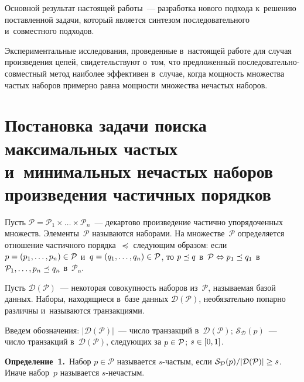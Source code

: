 \begin{multicols}{2}
    Основной результат настоящей работы~--- разработка нового подхода к~решению 
    поставленной задачи, который является синтезом последовательного и~совместного подходов. 
    
    Экспериментальные исследования, проведенные в~настоящей работе для случая
     произведения цепей, свидетельствуют о~том, что предложенный по\-сле\-до\-ва\-тель\-но-со\-вмест\-ный 
     метод наиболее эффективен в~случае, когда мощ\-ность множества час\-тых наборов примерно 
     равна мощ\-ности множества не\-час\-тых наборов.
     
     \vspace*{-6pt}
     
    
    \section{Постановка задачи поиска максимальных частых 
    и~минимальных нечастых наборов произведения частичных порядков}
    
         \vspace*{-2pt}
    
    Пусть $\mathcal{P} = \mathcal{P}_1 \times \dots \times \mathcal{P}_n$~--- 
    де\-кар\-то\-во произведение час\-тич\-но упорядоченных множеств. Элементы~$\mathcal{P}$ называются наборами. 
    На множестве~$\mathcal{P}$ определяется отношение частичного порядка~$\preceq$ сле\-ду\-ющим образом: 
    если $p \hm= (p_1, \dots, p_n) \hm\in \mathcal{P}$ и~$q \hm= (q_1, \dots, q_n)\hm \in \mathcal{P}$, 
    то $ p \hm\preceq q$ в~$ \mathcal{P}\hm \Leftrightarrow p_1 \hm\preceq q_1$ 
    в~$\mathcal{P}_1, \dots, p_n \hm\preceq q_n$ в~$ \mathcal{P}_n$.
    
    Пусть $\mathcal{D} (\mathcal{P})$~--- некоторая со\-во\-куп\-ность
     наборов из~$\mathcal{P}$, называемая базой данных. Наборы, на\-хо\-дя\-щи\-еся в~базе 
     данных $\mathcal{D} (\mathcal{P})$, необязательно по\-пар\-но раз\-лич\-ны и~называются транзакциями. 
     
    Введем обозначения: 
    $\vert \mathcal{D} (\mathcal{P}) \vert$~--- чис\-ло транз\-ак\-ций в~$\mathcal{D} (\mathcal{P})$; 
    $\mathcal{S}_\mathcal{D}(p)$~--- число транз\-ак\-ций в~$\mathcal{D} (\mathcal{P})$, 
    сле\-ду\-ющих за $p \hm\in \mathcal{P}$; $s \hm\in [0, 1]$. 
    
    \smallskip
    
    \noindent
    \textbf{Определение~1.}\
     Набор $p \in \mathcal{P}$ называется $s$-час\-тым, 
     если $\mathcal{S}_\mathcal{D}(p) / \vert \mathcal{D} (\mathcal{P}) \vert \hm\geq s$. Иначе набор~$p$ 
     называется $s$-не\-час\-тым.
    

\end{multicols}
